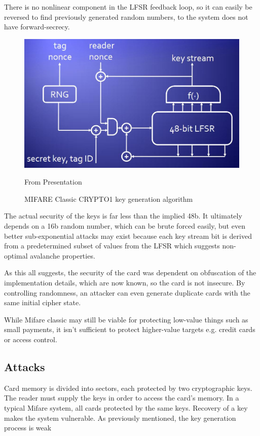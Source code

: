 \documentclass[12pt,a4paper]{article}
\begin{document}
There is no nonlinear component in the LFSR feedback loop, so it can easily be reversed to find previously generated random numbers, to the system does not have forward-secrecy.

\begin{figure} [ht]
	\centering
	\includegraphics[scale=0.5]{introduction/mifare_classic.jpg}
	\caption{MIFARE Classic CRYPTO1 key generation algorithm}
	From Presentation \cite{TODO}
\end{figure}

The actual security of the keys is far less than the implied 48b. It ultimately depends on a 16b random number, which can be brute forced easily, but even better sub-exponential attacks may exist because each key stream bit is derived from a predetermined subset of values from the LFSR which suggests non-optimal avalanche properties. %

As this all suggests, the security of the card was dependent on obfuscation of the implementation details, which are now known, so the card is not insecure. By controlling randomness, an attacker can even generate duplicate cards with the same initial cipher state.

While Mifare classic may still be viable for protecting low-value things such as small payments, it isn't sufficient to protect higher-value targets e.g. credit cards or access control.

\subsection{Attacks}
Card memory is divided into sectors, each protected by two cryptographic keys. The reader must supply the keys in order to access the card's memory. In a typical Mifare system, all cards protected by the same keys. Recovery of a key makes the system vulnerable. As previously mentioned, the key generation process is weak
\end{document}
